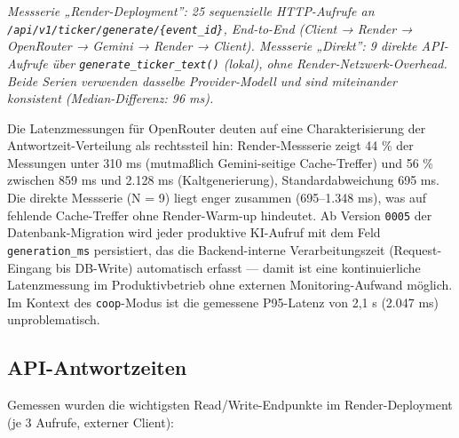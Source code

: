 \emph{Messserie „Render-Deployment'': 25 sequenzielle HTTP-Aufrufe an
\texttt{/api/v1/ticker/generate/\{event\_id\}}, End-to-End (Client →
Render → OpenRouter → Gemini → Render → Client). Messserie „Direkt'': 9
direkte API-Aufrufe über \texttt{generate\_ticker\_text()} (lokal), ohne
Render-Netzwerk-Overhead. Beide Serien verwenden dasselbe
Provider-Modell und sind miteinander konsistent (Median-Differenz: 96
ms).}

Die Latenzmessungen für OpenRouter deuten auf eine Charakterisierung der
Antwortzeit-Verteilung als rechtssteil hin: Render-Messserie zeigt 44 \%
der Messungen unter 310 ms (mutmaßlich Gemini-seitige Cache-Treffer) und
56 \% zwischen 859 ms und 2.128 ms (Kaltgenerierung), Standardabweichung
695 ms. Die direkte Messserie (N = 9) liegt enger zusammen (695--1.348
ms), was auf fehlende Cache-Treffer ohne Render-Warm-up hindeutet. Ab
Version \texttt{0005} der Datenbank-Migration wird jeder produktive
KI-Aufruf mit dem Feld \texttt{generation\_ms} persistiert, das die
Backend-interne Verarbeitungszeit (Request-Eingang bis DB-Write)
automatisch erfasst --- damit ist eine kontinuierliche Latenzmessung im
Produktivbetrieb ohne externen Monitoring-Aufwand möglich. Im Kontext
des \texttt{coop}-Modus ist die gemessene P95-Latenz von 2,1 s (2.047
ms) unproblematisch.

\subsection{API-Antwortzeiten}\label{api-antwortzeiten}

Gemessen wurden die wichtigsten Read/Write-Endpunkte im
Render-Deployment (je 3 Aufrufe, externer Client):

